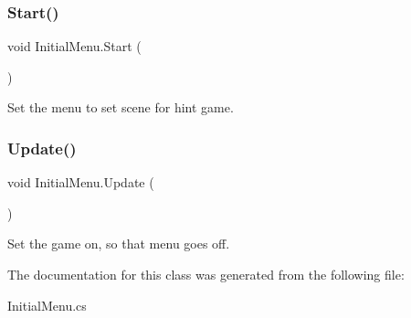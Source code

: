 \subsubsection{\texorpdfstring{Start()}{Start()}}
{\footnotesize\ttfamily void Initial\+Menu.\+Start (\begin{DoxyParamCaption}{ }\end{DoxyParamCaption})\hspace{0.3cm}{\ttfamily [private]}}



Set the menu to set scene for hint game. 

\hypertarget{class_initial_menu_adaf7345803cf408da2a759ae689d5c56}{}\label{class_initial_menu_adaf7345803cf408da2a759ae689d5c56} 
\subsubsection{\texorpdfstring{Update()}{Update()}}
{\footnotesize\ttfamily void Initial\+Menu.\+Update (\begin{DoxyParamCaption}{ }\end{DoxyParamCaption})\hspace{0.3cm}{\ttfamily [private]}}



Set the game on, so that menu goes off. 



The documentation for this class was generated from the following file\+:\begin{DoxyCompactItemize}
\item 
Initial\+Menu.\+cs\end{DoxyCompactItemize}
